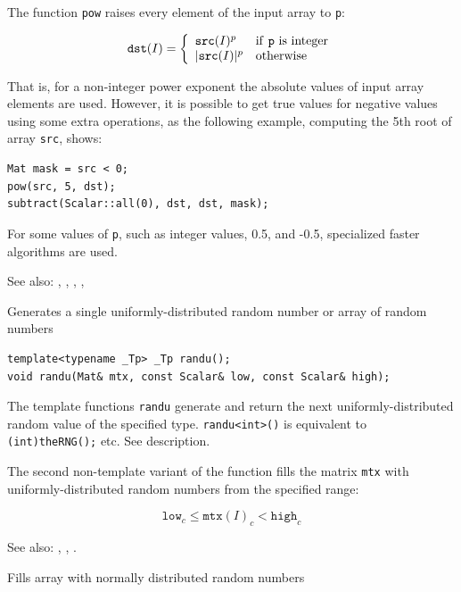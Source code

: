The function \texttt{pow} raises every element of the input array to \texttt{p}:

\[
\texttt{dst}(I) = \left\{ \begin{array}{l l} \texttt{src}(I)^p & \mbox{if \texttt{p} is integer}\\ |\texttt{src}(I)|^p & \mbox{otherwise}\\ \end{array} \right.
\]

That is, for a non-integer power exponent the absolute values of input array elements are used. However, it is possible to get true values for negative values using some extra operations, as the following example, computing the 5th root of array \texttt{src}, shows:

\begin{lstlisting}
Mat mask = src < 0;
pow(src, 5, dst);
subtract(Scalar::all(0), dst, dst, mask);
\end{lstlisting}

For some values of \texttt{p}, such as integer values, 0.5, and -0.5, specialized faster algorithms are used.

See also: , , , , 

\label{randu}
Generates a single uniformly-distributed random number or array of random numbers

\begin{lstlisting}
template<typename _Tp> _Tp randu();
void randu(Mat& mtx, const Scalar& low, const Scalar& high);
\end{lstlisting}
\begin{description}
\end{description}

The template functions \texttt{randu} generate and return the next uniformly-distributed random value of the specified type. \texttt{randu<int>()} is equivalent to \texttt{(int)theRNG();} etc. See  description.

The second non-template variant of the function fills the matrix \texttt{mtx} with uniformly-distributed random numbers from the specified range:

\[\texttt{low}_c \leq \texttt{mtx}(I)_c < \texttt{high}_c\]

See also: , , .

\label{randn}
Fills array with normally distributed random numbers

